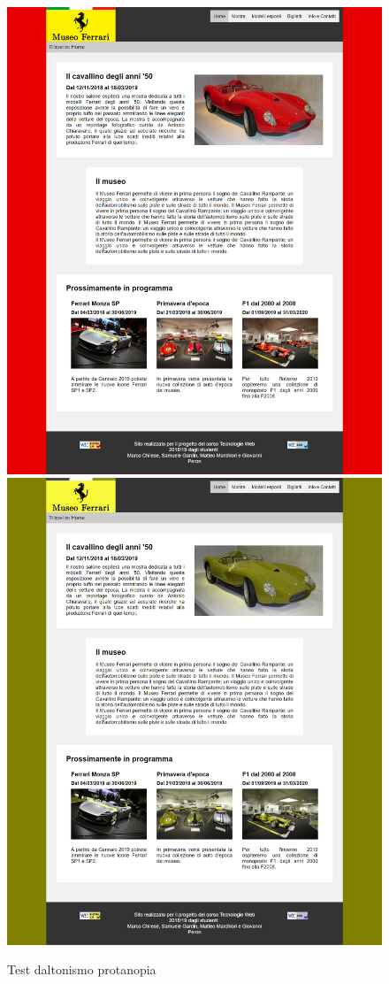 \begin{figure}[H]
	\begin{center}
		\includegraphics[scale=0.15]{Images/original.png}
		\includegraphics[scale=0.15]{Images/protanopia.png}
		\caption{Test daltonismo protanopia}
	\end{center}
\end{figure}

